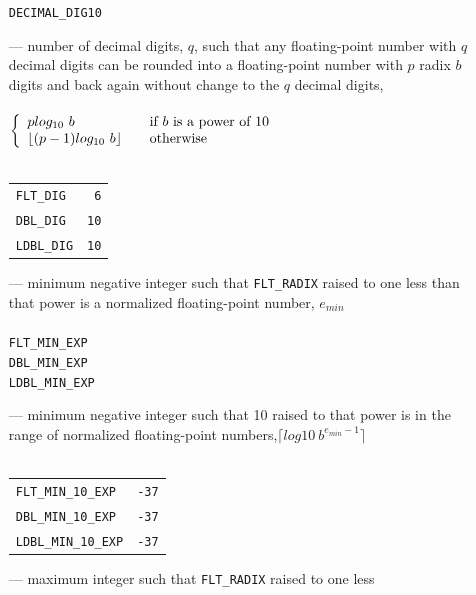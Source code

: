 \begin{itemize}
\texttt{DECIMAL\_DIG}\hfil\hspace*{2cm}\texttt{10}
\item[---] number of decimal digits, $q$, such that any floating-point number
  with $q$ decimal digits can be rounded into a floating-point number with $p$
  radix $b$ digits and back again without change to the $q$ decimal digits,\\\\
$\left\{ 
  \begin{array}{l l}
    plog_{10}~b & \quad \text{if $b$ is a power of 10}\\
    \lfloor (p - 1)log_{10}~b\rfloor & \quad \text{otherwise}
  \end{array} \right. $\\\\
\begin{tabular}{lr}
\texttt{FLT\_DIG}&\hfil\hspace*{2cm}\texttt{6}\\
\texttt{DBL\_DIG}&\hfil\hspace*{2cm}\texttt{10}\\
\texttt{LDBL\_DIG}&\hfil\hspace*{2cm}\texttt{10}
\end{tabular}
\item[---] minimum negative integer such that \texttt{FLT\_RADIX} raised to one
  less than that power is a normalized floating-point number, $e_{min}$\\\\
\texttt{FLT\_MIN\_EXP}\\
\texttt{DBL\_MIN\_EXP}\\
\texttt{LDBL\_MIN\_EXP}
\item[---] minimum negative integer such that 10 raised to that power is in the range of
normalized floating-point numbers,$\lceil log10~b^{e_{min}-1}\rceil$\\\\
\begin{tabular}{lr}
\texttt{FLT\_MIN\_10\_EXP}&\hfil\hspace*{2cm}\texttt{-37}\\
\texttt{DBL\_MIN\_10\_EXP}&\hfil\hspace*{2cm}\texttt{-37}\\
\texttt{LDBL\_MIN\_10\_EXP}&\hfil\hspace*{2cm}\texttt{-37}
\end{tabular}
\item[---] maximum integer such that \texttt{FLT\_RADIX} raised to one less

\end{itemize}
